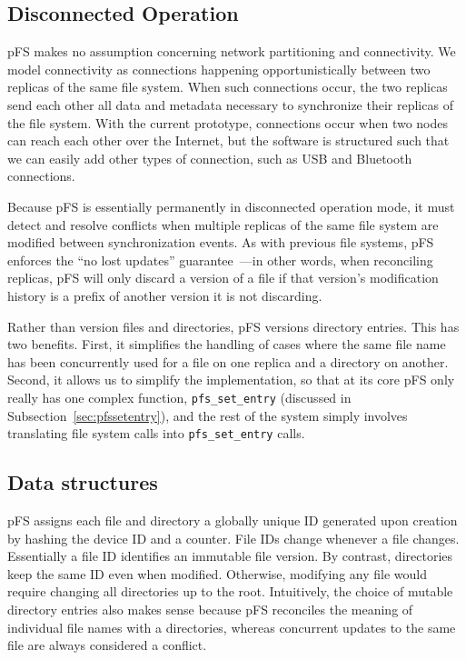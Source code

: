 \subsection{Disconnected Operation}

pFS makes no assumption concerning network partitioning and
connectivity.  We model connectivity as connections happening
opportunistically between two replicas of the same file system.  When
such connections occur, the two replicas send each other all data and
metadata necessary to synchronize their replicas of the file system.
With the current prototype, connections occur when two nodes can reach
each other over the Internet, but the software is structured such that
we can easily add other types of connection, such as USB and Bluetooth
connections.


Because pFS is essentially permanently in disconnected operation mode,
it must detect and resolve conflicts when multiple replicas of the
same file system are modified between synchronization events.  As with
previous file systems, pFS enforces the ``no lost updates''
guarantee~\cite{page:ficus}---in other words, when reconciling
replicas, pFS will only discard a version of a file if that version's
modification history is a prefix of another version it is not
discarding.

Rather than version files and directories, pFS versions directory
entries.  This has two benefits.  First, it simplifies the handling of
cases where the same file name has been concurrently used for a file
on one replica and a directory on another.  Second, it allows us to
simplify the implementation, so that at its core pFS only really has
one complex function, \texttt{pfs\_set\_entry} (discussed in
Subsection~\ref{sec:pfssetentry}), and the rest of the system simply
involves translating file system calls into \texttt{pfs\_set\_entry}
calls.

\subsection{Data structures}

pFS assigns each file and directory a globally unique ID generated
upon creation by hashing the device ID and a counter.  File IDs change
whenever a file changes.  Essentially a file ID identifies an
immutable file version.  By contrast, directories keep the same ID
even when modified.  Otherwise, modifying any file would require
changing all directories up to the root.  Intuitively, the choice of
mutable directory entries also makes sense because pFS reconciles the
meaning of individual file names with a directories, whereas
concurrent updates to the same file are always considered a conflict.

